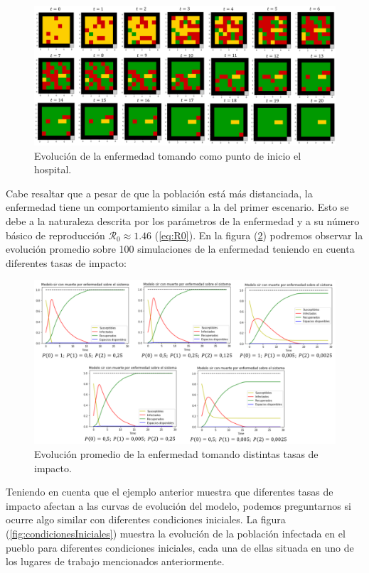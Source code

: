 \begin{figure}[h]
  \centering
    \includegraphics[width=1.05\textwidth]{Imagenes/evo2.PNG}
    \caption{Evolución de la enfermedad tomando como punto de inicio el hospital.}
    \label{fig:evo2}
\end{figure}

Cabe resaltar que a pesar de que la población está más distanciada, la enfermedad tiene un comportamiento similar a la del primer escenario. Esto se debe a la naturaleza descrita por los parámetros de la enfermedad y a su número básico de reproducción $\mathcal{R}_0\approx 1.46$ (\ref{eq:R0}). En la figura (\ref{fig:comparacionTasasdeImpacto}) podremos observar la evolución promedio sobre 100 simulaciones de la enfermedad teniendo en cuenta diferentes tasas de impacto:

\begin{figure}[h]
  \centering
    \includegraphics[width=1.05\textwidth]{Imagenes/comparacionTasasImpacto.PNG}
    \caption{Evolución promedio de la enfermedad tomando distintas tasas de impacto.}
    \label{fig:comparacionTasasdeImpacto}
\end{figure}

Teniendo en cuenta que el ejemplo anterior muestra que diferentes tasas de impacto afectan a las curvas de evolución del modelo, podemos preguntarnos si ocurre algo similar con diferentes condiciones iniciales. La figura (\ref{fig:condicionesIniciales}) muestra la evolución de la población infectada en el pueblo para diferentes condiciones iniciales, cada una de ellas situada en uno de los lugares de trabajo mencionados anteriormente.

